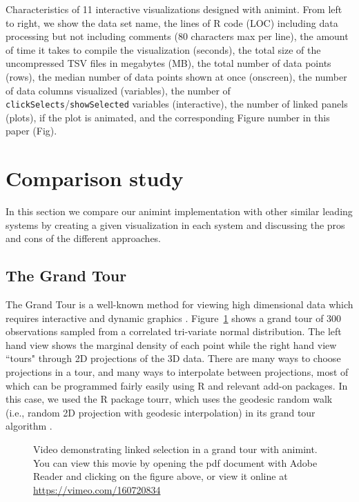 \documentclass[journal]{vgtc}\usepackage[]{graphicx}\usepackage[]{color}
\begin{document}
\begin{table}[htp] %
  \centering
  
  \vskip 0.2cm
  \caption{Characteristics of 11 interactive visualizations designed with
    animint. From left to right, we show the data set name, the
    lines of R code (LOC) including data processing but not including comments
    (80 characters max per line),
    the amount of time it takes to compile the visualization (seconds),
    the total size of the uncompressed TSV files in megabytes (MB),
    the total number of data points (rows),
    the median number of data points shown at once (onscreen),
    the number of data columns visualized (variables),
    the number of \texttt{clickSelects}/\texttt{showSelected} variables (interactive),
    the number of linked panels (plots),
    if the plot is animated,
    and the corresponding Figure number in this paper (Fig).
  }
\label{tab:examples}
\end{table}

\section{Comparison study}
\label{sec:compare}

In this section we compare our animint implementation with other similar
leading systems by creating a given visualization in each system and
discussing the pros and cons of the different approaches.

\subsection{The Grand Tour}
\label{sec:tour}

The Grand Tour is a well-known method for viewing high dimensional data which
requires interactive and dynamic graphics \citep{grand-tour}. 
Figure~\ref{fig:tour} shows a grand tour of 300 observations sampled
from a correlated tri-variate normal distribution. The left hand view
shows the marginal density of each point while the right hand view ``tours"
through 2D projections of the 3D data. There are many ways to
choose projections in a tour, and many ways to interpolate
between projections, most of which can be programmed fairly easily
using R and relevant add-on packages. In this case, we used the R package tourr,
which uses the geodesic random walk (i.e., random 2D projection with geodesic
interpolation) in its grand tour algorithm \citep{tourr}.

\begin{figure}[htp]
	\centerline{}
	\label{fig:tour}
	\caption{Video demonstrating linked selection in a grand tour with animint. You can view this movie by opening the pdf document with Adobe Reader and clicking on the figure above, or view it online at \url{https://vimeo.com/160720834}}
\end{figure}
\end{document}
